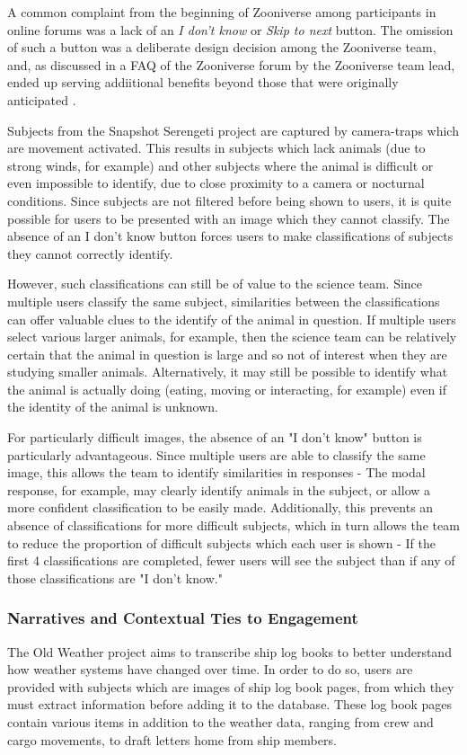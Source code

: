 \documentclass{sigchi}
\begin{document}
A common complaint from the beginning of Zooniverse among participants in online forums was a lack of an \emph{I don't know} or \emph{Skip to next} button.  The omission of such a button was a deliberate design decision among the Zooniverse team, and, as discussed in a FAQ of the Zooniverse forum by the Zooniverse team lead, ended up serving addiitional benefits beyond those that were originally anticipated \cite{afron-blog-post}.

Subjects from the Snapshot Serengeti project are captured by camera-traps which are movement activated. This results in subjects which lack animals (due to strong winds, for example) and other subjects where the animal is difficult or even impossible to identify, due to close proximity to a camera or nocturnal conditions. Since subjects are not filtered before being shown to users, it is quite possible for users to be presented with an image which they cannot classify. The absence of an I don't know button forces users to make classifications of subjects they cannot correctly identify.

However, such classifications can still be of value to the science team. Since multiple users classify the same subject, similarities between the classifications can offer valuable clues to the identify of the animal in question. If multiple users select various larger animals, for example, then the science team can be relatively certain that the animal in question is large and so not of interest when they are studying smaller animals. Alternatively, it may still be possible to identify what the animal is actually doing (eating, moving or interacting, for example) even if the identity of the animal is unknown. 

For particularly difficult images, the absence of an "I don't know" button is particularly advantageous. Since multiple users are able to classify the same image, this allows the team to identify similarities in responses - The modal response, for example, may clearly identify animals in the subject, or allow a more confident classification to be easily made. Additionally, this prevents an absence of classifications for more difficult subjects, which in turn allows the team to reduce the proportion of difficult subjects which each user is shown - If the first 4 classifications are completed, fewer users will see the subject than if any of those classifications are "I don't know."


\subsubsection{Narratives and Contextual Ties to Engagement}
The Old Weather project aims to transcribe ship log books to better understand how weather systems have changed over time. In order to do so, users are provided with subjects which are images of ship log book pages, from which they must extract information before adding it to the database. These log book pages contain various items in addition to the weather data, ranging from crew and cargo movements, to draft letters home from ship members. 
\end{document}
